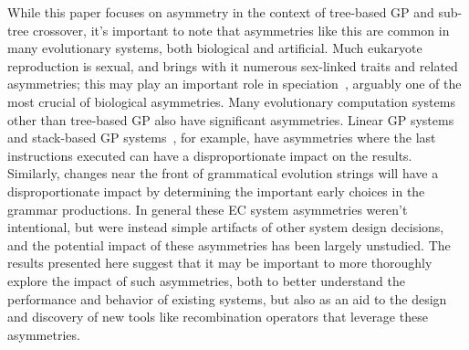\documentclass{sig-alternate}
\begin{document}
While this paper focuses on asymmetry in the context of tree-based GP and sub-tree crossover, 
it's important to note that asymmetries like this are common in many evolutionary systems, 
both biological and artificial. Much eukaryote reproduction is sexual, and brings with it 
numerous sex-linked traits and related asymmetries; this may play an important role in 
speciation~\cite{qvarnstrom2009speciation}, arguably one of the most crucial of biological 
asymmetries. Many evolutionary computation systems other than tree-based GP also have 
significant asymmetries. Linear GP systems~\cite{brameier2007linear} and stack-based GP 
systems~\cite{spector:2002:GPEM}, for example, have asymmetries where the last instructions
executed can have a disproportionate impact on the results. Similarly, changes near the front 
of grammatical evolution \cite{o2003grammatical} strings will have a disproportionate impact 
by determining the important early choices in the grammar productions. In general these 
EC system
asymmetries weren't intentional, but were instead simple artifacts of other system design 
decisions, and 
the potential impact of these asymmetries has been largely unstudied.
The results presented 
here suggest that it may be important to more thoroughly explore the impact of such asymmetries, 
both to better understand the performance and behavior of existing systems, but also as an aid 
to the design and discovery of new tools like recombination operators that leverage these 
asymmetries.





\end{document}
